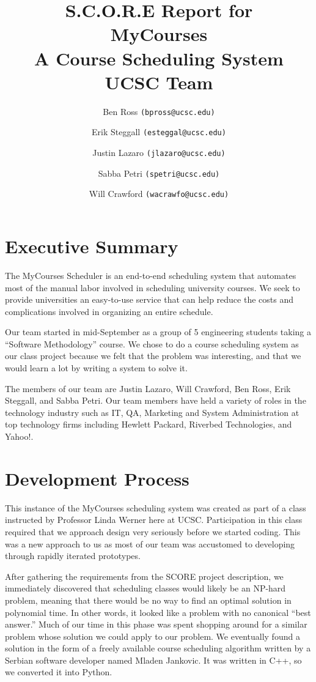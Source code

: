 \documentclass[12pt]{article}
\title{S.C.O.R.E Report for\\ MyCourses \\ A Course Scheduling System \\ UCSC Team}
\author{Ben Ross \texttt{(bpross@ucsc.edu)} \\
	\and Erik Steggall \texttt{(esteggal@ucsc.edu)}\\
	\and Justin Lazaro \texttt{(jlazaro@ucsc.edu)}\\
	\and Sabba Petri \texttt{(spetri@ucsc.edu)}\\
	\and Will Crawford \texttt{(wacrawfo@ucsc.edu)}}
\date{}
\begin{document}
\maketitle
\pagebreak
\tableofcontents
\pagebreak

\section{Executive Summary}
The MyCourses Scheduler is an end-to-end scheduling system that automates most of the manual labor involved in scheduling university courses. We seek to provide universities an easy-to-use service that can help reduce the costs and complications involved in organizing an entire schedule.


Our team started in mid-September as a group of 5 engineering students taking a ``Software Methodology'' course. We chose to do a course scheduling system as our class project because we felt that the problem was interesting, and that we would learn a lot by writing a system to solve it.

The members of our team are Justin Lazaro, Will Crawford, Ben Ross, Erik Steggall, and Sabba Petri. Our team members have held a variety of roles in the technology industry such as IT, QA, Marketing and System Administration at top technology firms including Hewlett Packard, Riverbed Technologies, and Yahoo!. 


\section{Development Process} %
\indent This instance of the MyCourses scheduling system was created as part of a class instructed by Professor Linda Werner here at UCSC. Participation in this class required that we approach design very seriously before we started coding. This was a new approach to us as most of our team was accustomed to developing through rapidly iterated prototypes.

After gathering the requirements from the SCORE project description, we immediately discovered that scheduling classes would likely be an NP-hard problem, meaning that there would be no way to find an optimal solution in polynomial time. In other words, it looked like a problem with no canonical ``best answer.'' Much of our time in this phase was spent shopping around for a similar problem whose solution we could apply to our problem. We eventually found a solution in the form of a freely available course scheduling algorithm written by a Serbian software developer named Mladen Jankovic. It was written in C++, so we converted it into Python.
\end{document}
